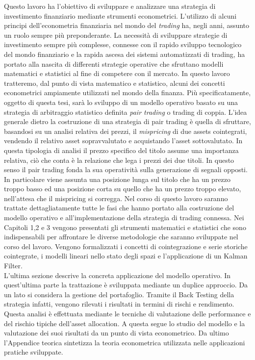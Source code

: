 \documentclass[]{article}
\begin{document}
Questo lavoro ha l’obiettivo di sviluppare e analizzare una strategia di investimento finanziario mediante strumenti econometrici. 
L'utilizzo di alcuni principi dell'econometria finanziaria nel mondo del \textit{trading} ha, negli anni, assunto un ruolo sempre più preponderante. La necessità di sviluppare strategie di investimento sempre più complesse, connesse con il rapido sviluppo tecnologico del mondo finanziario e la rapida ascesa dei sistemi automatizzati di trading, ha portato alla nascita di differenti strategie operative che sfruttano modelli matematici e statistici al fine di competere con il mercato.
In questo lavoro tratteremo, dal punto di vista matematico e statistico, alcuni dei concetti econometrici ampiamente utilizzati nel mondo della finanza. Più specificatamente, oggetto di questa tesi, sarà lo sviluppo di un modello operativo basato su una strategia di arbitraggio statistico definita \textit{pair trading} o trading di coppia.
L'idea generale dietro la costruzione di una strategia di pair trading è quella di sfruttare, basandosi su un analisi relativa dei prezzi, il \textit{mispricing} di due assets cointegrati, vendendo il relativo asset sopravvalutato e acquistando l'asset sottovalutato.
In questa tipologia di analisi il prezzo specifico del titolo assume una importanza relativa, ciò che conta è la relazione che lega i prezzi dei due titoli. In questo senso il pair trading fonda la sua operatività sulla generazione di segnali opposti. In particolare viene assunta una posizione lunga sul titolo che ha un prezzo troppo basso ed una posizione corta su quello che ha un prezzo troppo elevato, nell’attesa che il mispricing si corregga.
Nel corso di questo lavoro saranno trattate dettagliatamente tutte le fasi che hanno portato alla costruzione del modello operativo e all'implementazione della strategia di trading connessa.
Nei Capitoli 1,2 e 3 vengono presentati gli strumenti matematici e statistici che sono indispensabili per affrontare le diverse metodologie che saranno sviluppate nel corso del lavoro. Vengono formalizzati i concetti di cointegrazione e serie storiche cointegrate, i modelli lineari nello stato degli spazi e l'applicazione di un Kalman Filter.
\\
L’ultima sezione descrive la concreta applicazione del modello operativo. In quest’ultima parte la trattazione è sviluppata mediante un duplice approccio. Da un lato si considera la gestione del portafoglio. Tramite il Back Testing della strategia infatti, vengono rilevati i risultati in termini di rischi e rendimento. Questa analisi è effettuata mediante le tecniche di valutazione delle performance e del rischio tipiche dell'asset allocation. A questa segue lo studio del modello e la valutazione dei suoi risultati da un punto di vista econometrico. Da ultimo l’Appendice teorica sintetizza la teoria econometrica utilizzata nelle applicazioni pratiche sviluppate.
\end{document}
